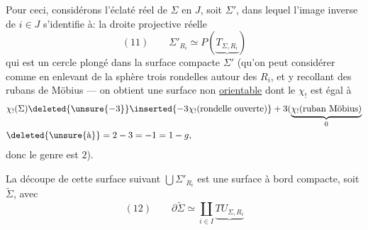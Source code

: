 Pour ceci, considérons l'éclaté réel de $\Sigma$ en $J$, soit $\Sigma'$, dans lequel l'image inverse de $i\in J$ s'identifie à:  la droite projective réelle
\[
(11)\qquad\Sigma'_{R_i}\simeq P(\underbrace{T_{\Sigma,R_i}})
\]
qui est un cercle plongé dans la surface compacte $\Sigma'$ (qu'on peut considérer comme  en enlevant de la sphère trois rondelles autour des $R_i$, et y recollant des rubans de Möbius --- on obtient une surface non \uline{orientable} dont le  $\chi_!$ est égal à
\[
\begin{aligned}
&\chi_!(\Sigma)\deleted{\unsure{-3}}\inserted{-3\chi_!(\text{rondelle ouverte})}+3(\underbrace{\chi_!(\text{ruban Möbius})}_{0}\\
&\deleted{\unsure{\text{à}}}=2-3=-1=1-g,
\end{aligned}
\]
donc le genre est $2$).

La découpe de cette surface suivant $\bigcup\Sigma'_{R_i}$ est une surface à bord compacte,   soit $\widetilde\Sigma$, avec
\[
(12)\qquad\partial\widetilde\Sigma\simeq\coprod_{i\in I}\underbrace{TU_{\Sigma,R_i}}
\]

